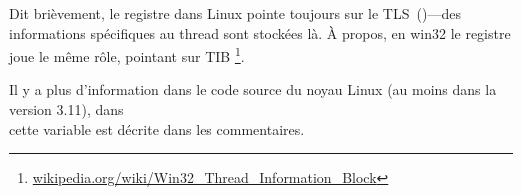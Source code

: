 Dit brièvement, le registre  dans Linux pointe toujours sur le
\ac{TLS}~()---des informations spécifiques au thread sont stockées là.
À propos, en win32 le registre  joue le même rôle, pointant sur \ac{TIB}
\footnote{\href{http://go.yurichev.com/17104}{wikipedia.org/wiki/Win32\_Thread\_Information\_Block}}.

Il y a plus d'information dans le code source du noyau Linux (au moins dans la version 3.11),
dans\\
 cette variable est décrite dans les commentaires.



